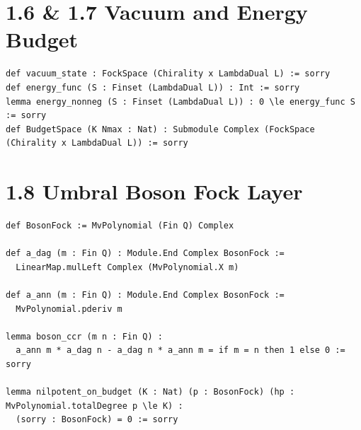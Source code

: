 \documentclass[12pt]{article}
\begin{document}
\section{1.6 \& 1.7 Vacuum and Energy Budget}
\begin{lstlisting}[language=lean]
def vacuum_state : FockSpace (Chirality x LambdaDual L) := sorry
def energy_func (S : Finset (LambdaDual L)) : Int := sorry
lemma energy_nonneg (S : Finset (LambdaDual L)) : 0 \le energy_func S := sorry
def BudgetSpace (K Nmax : Nat) : Submodule Complex (FockSpace (Chirality x LambdaDual L)) := sorry
\end{lstlisting}

\section{1.8 Umbral Boson Fock Layer}
\begin{lstlisting}[language=lean]
def BosonFock := MvPolynomial (Fin Q) Complex

def a_dag (m : Fin Q) : Module.End Complex BosonFock :=
  LinearMap.mulLeft Complex (MvPolynomial.X m)

def a_ann (m : Fin Q) : Module.End Complex BosonFock :=
  MvPolynomial.pderiv m

lemma boson_ccr (m n : Fin Q) :
  a_ann m * a_dag n - a_dag n * a_ann m = if m = n then 1 else 0 := sorry

lemma nilpotent_on_budget (K : Nat) (p : BosonFock) (hp : MvPolynomial.totalDegree p \le K) : 
  (sorry : BosonFock) = 0 := sorry
\end{lstlisting}
\end{document}
